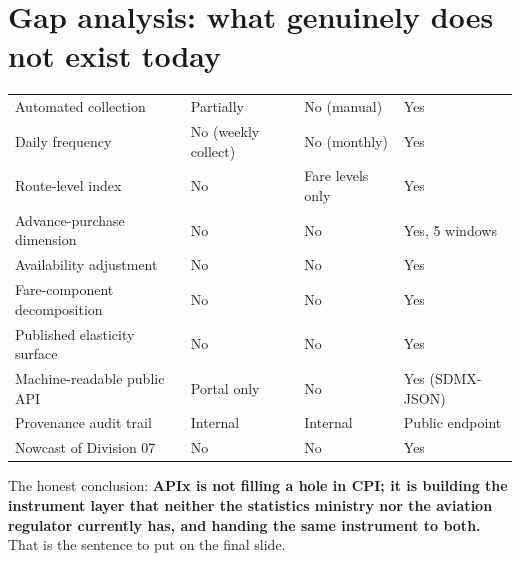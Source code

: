 \section{Gap analysis: what genuinely does not exist today}

\begin{center}
\small
\begin{tabularx}{\textwidth}{@{}L{4.2cm} C{2.3cm} C{2.3cm} X@{}}
\toprule
{} &  &  &  \\
\midrule
Automated collection & Partially & No (manual) & Yes \\
Daily frequency & No (weekly collect) & No (monthly) & Yes \\
Route-level index & No & Fare levels only & Yes \\
Advance-purchase dimension & No & No & Yes, 5 windows \\
Availability adjustment & No & No & Yes \\
Fare-component decomposition & No & No & Yes \\
Published elasticity surface & No & No & Yes \\
Machine-readable public API & Portal only & No & Yes (SDMX-JSON) \\
Provenance audit trail & Internal & Internal & Public endpoint \\
Nowcast of Division 07 & No & No & Yes \\
\bottomrule
\end{tabularx}
\end{center}

\noindent The honest conclusion: \textbf{APIx is not filling a hole in CPI; it is building
the instrument layer that neither the statistics ministry nor the aviation regulator
currently has, and handing the same instrument to both.} That is the sentence to put on the
final slide.

